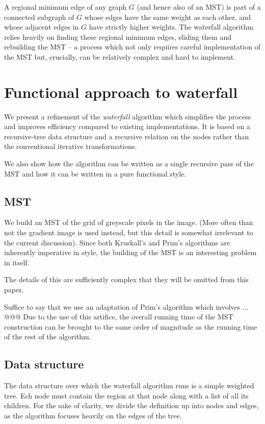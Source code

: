 \documentclass{jfp}
\begin{document}
A regional minimum edge of any graph $G$ (and hence also of an MST) is
part of a connected subgraph of $G$ whose edges have the same weight
as each other, and whose adjacent edges in $G$ have strictly higher
weights. The waterfall algorithm relies heavily on finding these
regional minimum edges, eliding them and rebuilding the MST -- a
process which not only requires careful implementation of the MST but,
crucially, can be relatively complex and hard to implement.


\section{Functional approach to waterfall}


We present a refinement of the {\em waterfall\/} algorithm which
simplifies the process and improves efficiency compared to existing
implementations. It is based on a recursive-tree data structure and a
recursive relation on the nodes rather than the conventional iterative
transformations.

We also show how the algorithm can be written as a single recursive
pass of the MST and how it can be written in a pure functional style.

\subsection{MST}

We build an MST of the grid of greyscale pixels in the image. (More
often than not the gradient image is used instead, but this detail is
somewhat irrelevant to the current discussion). Since both Kruskall's
and Prim's algorithms are inherently imperative in style, the building
of the MST is an interesting problem in itself.

The details of this are sufficiently complex that they will be omitted
from this paper.

Suffice to say that we use an adaptation of Prim's algorithm which
involves ... @@@ Due to the use of this artifice, the overall running
time of the MST construction can be brought to the same order of
magnitude as the running time of the rest of the algorithm.


\subsection{Data structure}

The data structure over which the waterfall algorithm runs is a simple
weighted tree. Ech node must contain the region at that node along
with a list of all its children.  For the sake of clarity, we divide
the definition up into nodes and edges, as the algorithm focuses
heavily on the edges of the tree.
\end{document}

